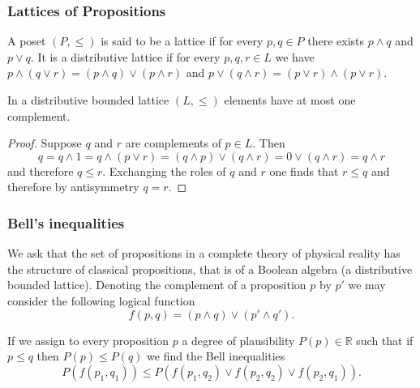 \documentclass{beamer}
\theoremstyle{definition}
\begin{document}
\begin{frame}

\frametitle{Lattices of Propositions}

\begin{definition}
A poset $(P,\leq)$ is said to be a lattice if for every $p,q\in P$ there exists $p\wedge q$ and $p\vee q$. It is a distributive lattice if for every $p,q,r\in L$ we have $p\wedge (q\vee r)=(p\wedge q)\vee (p\wedge r)$ and $p\vee (q\wedge r)=(p\vee r)\wedge (p\vee r)$.
\end{definition}

\begin{theorem}
In a distributive bounded lattice $(L,\leq)$ elements have at most one complement.
\end{theorem}

\begin{proof}
Suppose $q$ and $r$ are complements of $p\in L$. Then
\begin{equation}
q = q\wedge 1 = q\wedge (p\vee r) =(q\wedge p)\vee(q\wedge r) = 0\vee(q\wedge r)=q\wedge r 
\end{equation}
and therefore $q\leq r$. Exchanging the roles of $q$ and $r$ one finds that $r\leq q$ and therefore by antisymmetry $q=r$.
\end{proof}

\end{frame}

\begin{frame}

\frametitle{Bell's inequalities}

We ask that the set of propositions in a complete theory of physical reality has the structure of classical propositions, that is of a Boolean algebra (a distributive bounded lattice). Denoting the complement of a proposition $p$ by $p'$ we may consider the following logical function
\begin{equation}
f(p,q)=(p\wedge q)\vee (p' \wedge q').
\end{equation}

If we assign to every proposition $p$ a degree of plausibility $P(p)\in\mathbb{R}$ such that if $p\leq q$ then $P(p)\leq P(q)$ we find the Bell inequalities
\begin{equation}
P(f(p_1,q_1))\leq P(f(p_1,q_2)\vee f(p_2,q_2)\vee f(p_2,q_1)).
\end{equation}

\end{frame}
\end{document}
